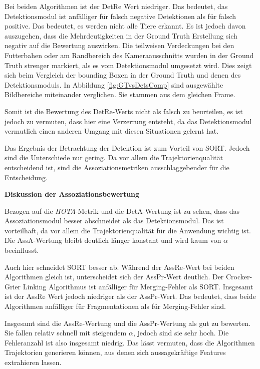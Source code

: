Bei beiden Algorithmen ist der DetRe Wert niedriger. Das bedeutet, das Detektionsmodul ist anfälliger für falsch negative Detektionen als für falsch positive. Das bedeutet, es werden nicht alle Tiere erkannt. Es ist jedoch davon auszugehen, dass die Mehrdeutigkeiten in der Ground Truth Erstellung sich negativ auf die Bewertung auswirken. Die teilweisen Verdeckungen bei den Futterbahen oder am Randbereich des Kameraausschnitts wurden in der Ground Truth strenger markiert, als es vom Detektionsmodul umgesetzt wird. Dies zeigt sich beim Vergleich der bounding Boxen in der Ground Truth und denen des Detektionsmoduls. In Abbildung \ref{fig:GTvsDetsComp} sind ausgewählte Bildbereiche miteinander verglichen. Sie stammen aus dem gleichen Frame. \par

Somit ist die Bewertung des DetRe-Werts nicht als falsch zu beurteilen, es ist jedoch zu vermuten, dass hier eine Verzerrung entsteht, da das Detektionsmodul vermutlich einen anderen Umgang mit diesen Situationen gelernt hat.\par

Das Ergebnis der Betrachtung der Detektion ist zum Vorteil von SORT. Jedoch sind die Unterschiede nur gering. Da vor allem die Trajektorienqualität entscheidend ist, sind die Assoziationsmetriken ausschlaggebender für die Entscheidung.\dubpar


\textbf{Diskussion der Assoziationsbewertung}\par
Bezogen auf die \textit{HOTA}-Metrik und die DetA-Wertung ist zu sehen, dass das Assoziationsmodul besser abschneidet als das Detektionsmodul. Das ist vorteilhaft, da vor allem die Trajektorienqualität für die Anwendung wichtig ist. Die AssA-Wertung bleibt deutlich länger konstant und wird kaum von \(\alpha\) beeinflusst. \par

Auch hier schneidet SORT besser ab. Während der AssRe-Wert bei beiden Algorithmen gleich ist, unterscheidet sich der AssPr-Wert deutlich. Der  Crocker-Grier Linking Algorithmus ist anfälliger für Merging-Fehler als SORT. Insgesamt ist der AssRe Wert jedoch niedriger als der AssPr-Wert. Das bedeutet, dass beide Algorithmen anfälliger für Fragmentationen als für Merging-Fehler sind.\par

Insgesamt sind die AssRe-Wertung und die AssPr-Wertung als gut zu bewerten. Sie fallen relativ schnell mit steigendem \(\alpha\), jedoch sind sie sehr hoch. Die Fehleranzahl ist also insgesamt niedrig. Das lässt vermuten, dass die Algorithmen Trajektorien generieren können, aus denen sich aussagekräftige Features extrahieren lassen.\dubpar

